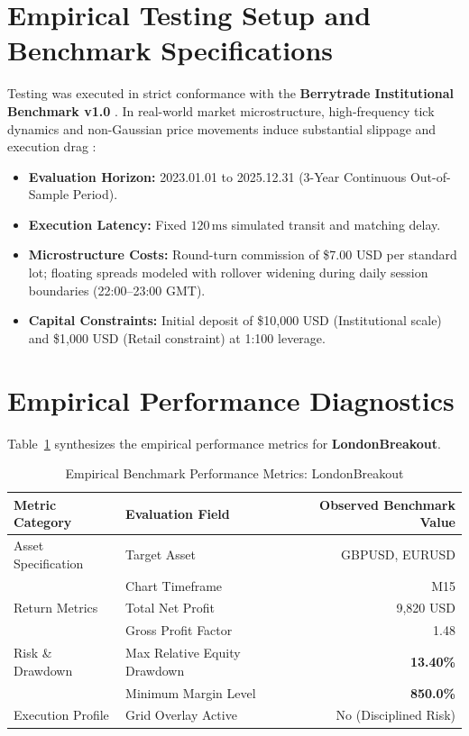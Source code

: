 \documentclass[11pt,a4paper]{article}
\begin{document}
\section{Empirical Testing Setup and Benchmark Specifications}
Testing was executed in strict conformance with the \textbf{Berrytrade Institutional Benchmark v1.0} \cite{artsu2026illusion}. In real-world market microstructure, high-frequency tick dynamics and non-Gaussian price movements induce substantial slippage and execution drag \cite{kyle1985continuous, amihud2002illiquidity, cont2001empirical, mandelbrot1963variation}:
\begin{itemize}
    \item \textbf{Evaluation Horizon:} 2023.01.01 to 2025.12.31 (3-Year Continuous Out-of-Sample Period).
    \item \textbf{Execution Latency:} Fixed $120\,\text{ms}$ simulated transit and matching delay.
    \item \textbf{Microstructure Costs:} Round-turn commission of \$7.00 USD per standard lot; floating spreads modeled with rollover widening during daily session boundaries (22:00--23:00 GMT).
    \item \textbf{Capital Constraints:} Initial deposit of \$10,000 USD (Institutional scale) and \$1,000 USD (Retail constraint) at 1:100 leverage.
\end{itemize}

\section{Empirical Performance Diagnostics}
Table~\ref{tab:metrics} synthesizes the empirical performance metrics for \textbf{LondonBreakout}.

\begin{table}[H]
\centering
\caption{Empirical Benchmark Performance Metrics: LondonBreakout}
\label{tab:metrics}
\begin{tabular}{llr}
\toprule
\textbf{Metric Category} & \textbf{Evaluation Field} & \textbf{Observed Benchmark Value} \\
\midrule
Asset Specification & Target Asset & GBPUSD, EURUSD \\
& Chart Timeframe & M15 \\
Return Metrics & Total Net Profit & 9,820 USD \\
& Gross Profit Factor & 1.48 \\
Risk \& Drawdown & Max Relative Equity Drawdown & \textbf{13.40\%} \\
& Minimum Margin Level & \textbf{850.0\%} \\
Execution Profile & Grid Overlay Active & No (Disciplined Risk) \\
\bottomrule
\end{tabular}
\end{table}
\end{document}

